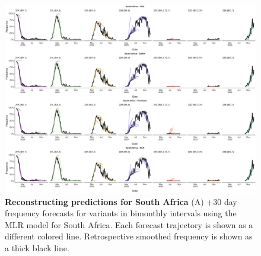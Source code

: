 
\begin{figure}[th!]
	\centering
	\includegraphics[width=0.9\textwidth=0.01]{supp_figures/supplementary_fig_South Africa.png}
	\caption{
		\textbf{Reconstructing predictions for South Africa}
		(A) +30 day frequency forecasts for variants in bimonthly intervals using the MLR model for South Africa.
		Each forecast trajectory is shown as a different colored line.
		Retrospective smoothed frequency is shown as a thick black line.
	}
	\label{fig:S4}
\end{figure}


